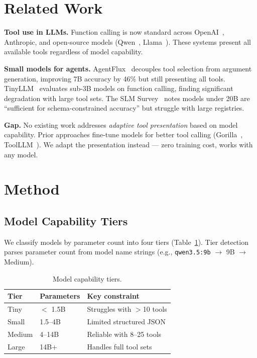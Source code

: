 \documentclass[11pt]{article}
\begin{document}
\section{Related Work}

\textbf{Tool use in LLMs.} Function calling is now standard across OpenAI~\cite{openai_fc}, Anthropic, and open-source models (Qwen~\cite{qwen25}, Llama~\cite{llama3}). These systems present all available tools regardless of model capability.

\textbf{Small models for agents.} AgentFlux~\cite{agentflux} decouples tool selection from argument generation, improving 7B accuracy by 46\% but still presenting all tools. TinyLLM~\cite{tinyllm} evaluates sub-3B models on function calling, finding significant degradation with large tool sets. The SLM Survey~\cite{slm_survey} notes models under 20B are ``sufficient for schema-constrained accuracy'' but struggle with large registries.

\textbf{Gap.} No existing work addresses \emph{adaptive tool presentation} based on model capability. Prior approaches fine-tune models for better tool calling (Gorilla~\cite{gorilla}, ToolLLM~\cite{toollm}). We adapt the presentation instead --- zero training cost, works with any model.

\section{Method}

\subsection{Model Capability Tiers}

We classify models by parameter count into four tiers (Table~\ref{tab:tiers}). Tier detection parses parameter count from model name strings (e.g., \texttt{qwen3.5:9b} $\rightarrow$ 9B $\rightarrow$ Medium).

\begin{table}[h]
\centering
\caption{Model capability tiers.}
\label{tab:tiers}
\small
\begin{tabular}{@{}lll@{}}
\toprule
Tier & Parameters & Key constraint \\
\midrule
Tiny & $<$ 1.5B & Struggles with $>$10 tools \\
Small & 1.5--4B & Limited structured JSON \\
Medium & 4--14B & Reliable with 8--25 tools \\
Large & 14B+ & Handles full tool sets \\
\bottomrule
\end{tabular}
\end{table}
\end{document}
